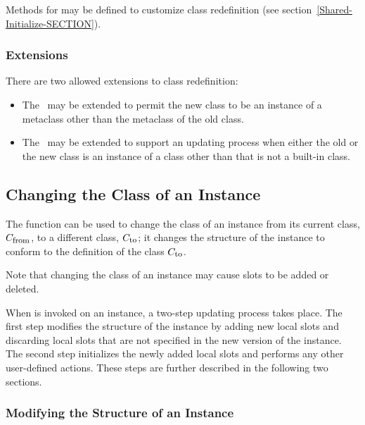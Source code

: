 Methods for  may be defined to customize class
redefinition (see section~\ref{Shared-Initialize-SECTION}).


\subsubsection{Extensions}

There are two allowed extensions to class redefinition: 

\begin{itemize}

\item  The \OS\ may be extended to permit the new class
to be an instance of a metaclass other than the metaclass of the
old class.

\item  The \OS\ may be extended to support an updating process
when either the old or the new class is an instance of a
class other than  that is not a built-in class.

\end{itemize}


\subsection{Changing the Class of an Instance}
\label{Changing-the-Class-of-an-Instance-SECTION}

The function  can be used to change the class of an
instance from its current class, $C_ {\hbox{{\footnotesize\rm from}}}$, to a
different class, $C_ {\hbox{{\footnotesize\rm to}}}$; it changes the
structure of the instance to conform to the definition of the class
$C_ {\hbox{{\footnotesize\rm to}}}$.

Note that changing the class of an instance may cause slots to be
added or deleted. 

When  is invoked on an instance, a two-step updating
process takes place.  The first step modifies the structure of
the instance by adding new local slots and discarding local slots that
are not specified in the new version of the instance.  The second step
initializes the newly added local slots and performs any other
user-defined actions. These steps are further described in the
following two sections.

\subsubsection{Modifying the Structure of an Instance}

